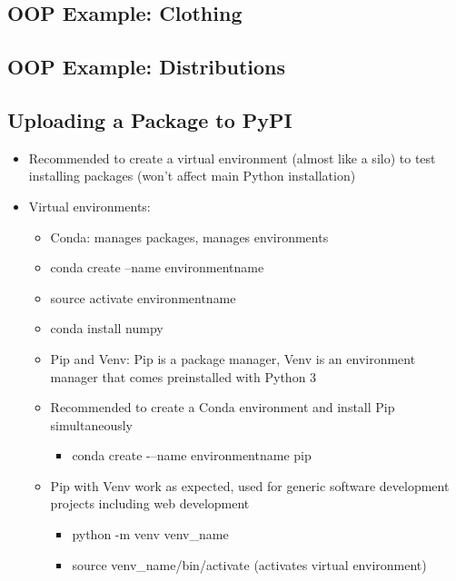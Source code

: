 \subsection{OOP Example: Clothing}


\subsection{OOP Example: Distributions}


\subsection{Uploading a Package to PyPI}
\begin{itemize}
	\item Recommended to create a virtual environment (almost like a silo) to test installing packages (won't affect main Python installation)
	\item Virtual environments:
	\begin{itemize}
		\item Conda: manages packages, manages environments
		\item conda create --name environmentname
		\item source activate environmentname
		\item conda install numpy
		\item Pip and Venv: Pip is a package manager, Venv is an environment manager that comes preinstalled with Python 3
		\item Recommended to create a Conda environment and install Pip simultaneously
		\begin{itemize}
			\item conda create -–name environmentname pip
		\end{itemize}
		\item Pip with Venv work as expected, used for generic software development projects including web development
		\begin{itemize}
			\item python -m venv venv\_name
			\item source venv\_name/bin/activate (activates virtual environment)
		\end{itemize}
	\end{itemize}
\end{itemize}










